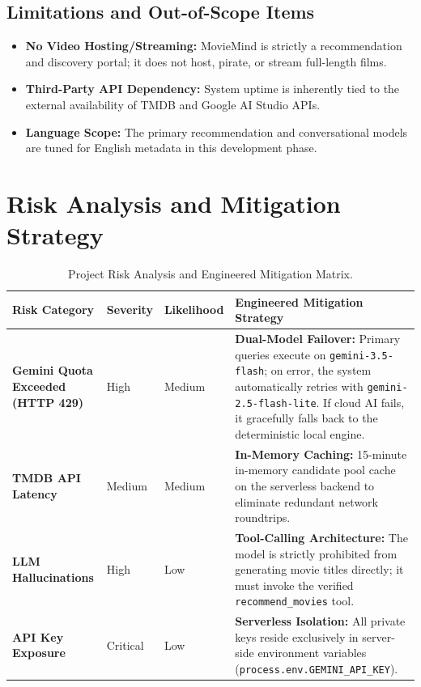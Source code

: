 \documentclass[11pt,a4paper]{article}
\begin{document}
\subsection{Limitations and Out-of-Scope Items}
\begin{itemize}[leftmargin=*]
    \item \textbf{No Video Hosting/Streaming:} MovieMind is strictly a recommendation and discovery portal; it does not host, pirate, or stream full-length films.
    \item \textbf{Third-Party API Dependency:} System uptime is inherently tied to the external availability of TMDB and Google AI Studio APIs.
    \item \textbf{Language Scope:} The primary recommendation and conversational models are tuned for English metadata in this development phase.
\end{itemize}

\section{Risk Analysis and Mitigation Strategy}

\begin{table}[H]
\centering
\small
\begin{tabularx}{\textwidth}{p{3.5cm} p{1.6cm} p{1.8cm} X}
\toprule
\rowcolor{tableheader}
\textbf{Risk Category} & \textbf{Severity} & \textbf{Likelihood} & \textbf{Engineered Mitigation Strategy} \\
\midrule
\textbf{Gemini Quota Exceeded (HTTP 429)} & High & Medium & \textbf{Dual-Model Failover:} Primary queries execute on \texttt{gemini-3.5-flash}; on error, the system automatically retries with \texttt{gemini-2.5-flash-lite}. If cloud AI fails, it gracefully falls back to the deterministic local engine. \\
\addlinespace
\textbf{TMDB API Latency} & Medium & Medium & \textbf{In-Memory Caching:} 15-minute in-memory candidate pool cache on the serverless backend to eliminate redundant network roundtrips. \\
\addlinespace
\textbf{LLM Hallucinations} & High & Low & \textbf{Tool-Calling Architecture:} The model is strictly prohibited from generating movie titles directly; it must invoke the verified \texttt{recommend\_movies} tool. \\
\addlinespace
\textbf{API Key Exposure} & Critical & Low & \textbf{Serverless Isolation:} All private keys reside exclusively in server-side environment variables (\texttt{process.env.GEMINI\_API\_KEY}). \\
\bottomrule
\end{tabularx}
\caption{Project Risk Analysis and Engineered Mitigation Matrix.}
\label{tab:risk}
\end{table}
\end{document}
